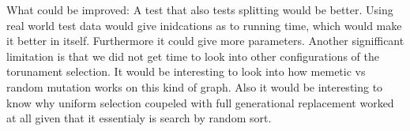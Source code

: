 What could be improved: A test that also tests splitting would be better. Using real world test data would give inidcations as to running time, which would make it better in itself. Furthermore it could give more parameters. Another signifficant limitation is that we did not get time to look into other configurations of the torunament selection. It would be interesting to look into how memetic vs random mutation works on this kind of graph. Also it would be interesting to know why uniform selection coupeled with full generational replacement worked at all given that it essentialy is search by random sort.


